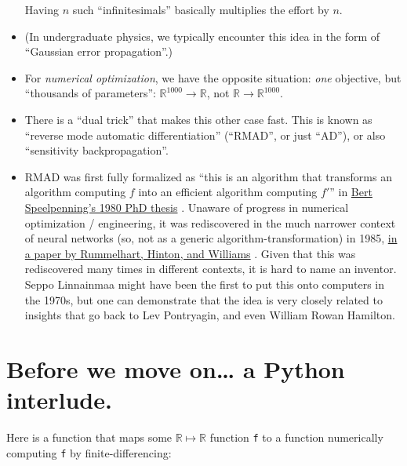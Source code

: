 \documentclass[11pt]{article}
\begin{document}
\begin{itemize}
  Having \(n\) such ``infinitesimals'' basically multiplies the effort
  by \(n\).
\item
  (In undergraduate physics, we typically encounter this idea in the
  form of ``Gaussian error propagation''.)
\item
  For \emph{numerical optimization}, we have the opposite situation:
  \emph{one} objective, but ``thousands of parameters'':
  \({\mathbb R}^{1000}\to{\mathbb R}\), not
  \({\mathbb R}\to{\mathbb R}^{1000}\).
\item
  There is a ``dual trick'' that makes this other case fast. This is
  known as ``reverse mode automatic differentiation'' (``RMAD'', or just
  ``AD''), or also ``sensitivity backpropagation''.
\item
  RMAD was first fully formalized as ``this is an algorithm that
  transforms an algorithm computing \(f\) into an efficient algorithm
  computing \(f'\)'' in
  \href{https://www.osti.gov/servlets/purl/5254402}{Bert Speelpenning's
  1980 PhD thesis} \cite{speelpenning1980compiling}. Unaware of progress in numerical optimization /
  engineering, it was rediscovered in the much narrower context of
  neural networks (so, not as a generic algorithm-transformation) in
  1985, \href{https://www.nature.com/articles/323533a0}{in a paper by
  Rummelhart, Hinton, and Williams} \cite{rumelhart1986learning}. Given that this was rediscovered
  many times in different contexts, it is hard to name an inventor.
  Seppo Linnainmaa might have been the first to put this onto computers
  in the 1970s, but one can demonstrate that the idea is very closely
  related to insights that go back to Lev Pontryagin, and even William
  Rowan Hamilton.
\end{itemize}

    \hypertarget{before-we-move-on-a-python-interlude.}{%
\section{Before we move on\ldots{} a Python
interlude.}\label{before-we-move-on-a-python-interlude.}}

Here is a function that maps some \({\mathbb R}\mapsto{\mathbb R}\)
function \texttt{f} to a function numerically computing
\texttt{f\textquotesingle{}} by finite-differencing:
\end{document}
